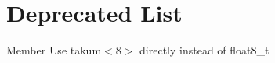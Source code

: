 \chapter{Deprecated List}
\hypertarget{deprecated}{}\label{deprecated}

\begin{DoxyRefList}
\item[Member \doxylink{compatibility_8h_a0b6073f41b40722c6d9963184eecc93f}{float8\+\_\+t} ]\label{deprecated__deprecated000001}%
%
Use takum$<$8$>$ directly instead of float8\+\_\+t 
\end{DoxyRefList}